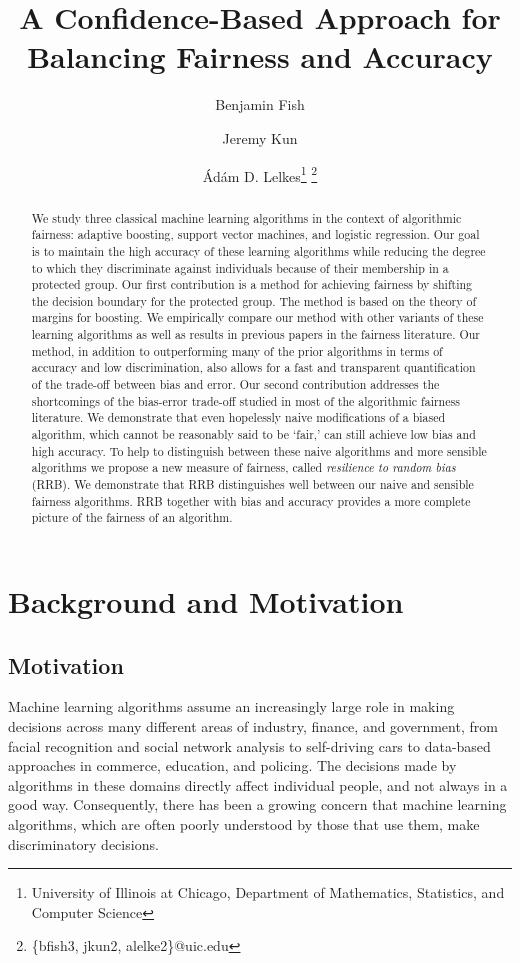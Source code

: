 \documentclass[twoside,leqno,twocolumn]{article}
\title{A Confidence-Based Approach for Balancing Fairness and Accuracy}
\author{Benjamin Fish\and Jeremy Kun\and \'Ad\'am D. Lelkes\thanks{University
of Illinois at Chicago, Department of Mathematics, Statistics, and Computer
Science} \thanks{\{bfish3, jkun2, alelke2\}@uic.edu}}
\begin{document}
\maketitle

\begin{abstract} 

We study three classical machine learning algorithms in the context of
algorithmic fairness: adaptive boosting, support vector machines, and logistic
regression.  Our goal is to maintain the high accuracy of these learning
algorithms while reducing the degree to which they discriminate against
individuals because of their membership in a protected group. Our first
contribution is a method for achieving fairness by shifting the decision
boundary for the protected group.  The method is based on the theory of margins
for boosting. We empirically compare our method with other variants of these
learning algorithms as well as results in previous papers in the fairness
literature.  Our method, in addition to outperforming many of the prior
algorithms in terms of accuracy and low discrimination, also allows for a fast
and transparent quantification of the trade-off between bias and error. Our
second contribution addresses the shortcomings of the bias-error trade-off
studied in most of the algorithmic fairness literature. We demonstrate that
even hopelessly naive modifications of a biased algorithm, which cannot be
reasonably said to be `fair,' can still achieve low bias and high accuracy.  To
help to distinguish between these naive algorithms and more sensible algorithms
we propose a new measure of fairness, called \emph{resilience to random bias}
(RRB).  We demonstrate that RRB distinguishes well between our naive and
sensible fairness algorithms.  RRB together with bias and accuracy provides a
more complete picture of the fairness of an algorithm. 

\end{abstract}

\section{Background and Motivation} \label{sec:background}

\subsection{Motivation}

Machine learning algorithms assume an increasingly large role in making
decisions across many different areas of industry, finance, and government,
from facial recognition and social network analysis to self-driving cars to
data-based approaches in commerce, education, and policing. The decisions made
by algorithms in these domains directly affect individual people, and not
always in a good way. Consequently, there has been a growing concern that
machine learning algorithms, which are often poorly understood by those that
use them, make discriminatory decisions.
\end{document}
